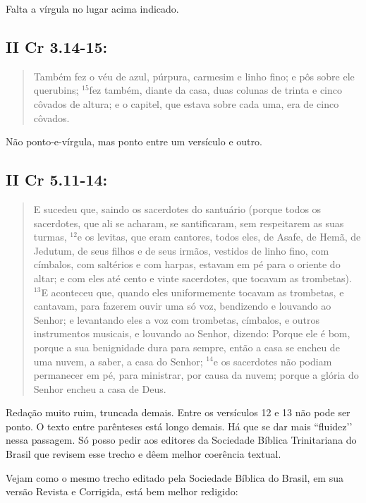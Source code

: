 Falta a vírgula no lugar acima indicado.

\subsection{II Cr 3.14-15:}
\begin{quote}
    \small
 Também fez o véu de azul, púrpura, carmesim e linho fino; e pôs sobre ele querubins\uline{;} $^{\mathrm{15}}$fez também, diante da casa, duas colunas de trinta e cinco côvados de altura; e o capitel, que estava sobre cada uma, era de cinco côvados.
 \end{quote}
 
Não ponto-e-vírgula, mas ponto entre um versículo e outro.

\subsection{II Cr 5.11-14:}
\begin{quote}
    \small
 E sucedeu que, saindo os sacerdotes do santuário (porque todos os sacerdotes, que ali se acharam, se santificaram, sem respeitarem as suas turmas, $^{\mathrm{12}}$e os levitas, que eram cantores, todos eles, de Asafe, de Hemã, de Jedutum, de seus filhos e de seus irmãos, vestidos de linho fino, com címbalos, com saltérios e com harpas, estavam em pé para o oriente do altar; e com eles até cento e vinte sacerdotes, que tocavam as trombetas). $^{\mathrm{13}}$E aconteceu que, quando eles uniformemente tocavam as trombetas, e cantavam, para fazerem ouvir uma só voz, bendizendo e louvando ao Senhor; e levantando eles a voz com trombetas, címbalos, e outros instrumentos musicais, e louvando ao Senhor, dizendo: Porque ele é bom, porque a sua benignidade dura para sempre, então a casa se encheu de uma nuvem, a saber, a casa do Senhor; $^{\mathrm{14}}$e os sacerdotes não podiam permanecer em pé, para ministrar, por causa da nuvem; porque a glória do Senhor encheu a casa de Deus.
\end{quote}

Redação muito ruim, truncada demais. Entre os versículos 12 e 13
não pode ser ponto. O texto entre parênteses está longo demais. Há que
se dar mais ``fluidez’’ nessa passagem. Só posso pedir aos editores
da Sociedade Bíblica Trinitariana do Brasil que revisem esse trecho e
dêem melhor coerência textual.

Vejam como o mesmo trecho editado pela Sociedade Bíblica
do Brasil, em sua versão Revista e Corrigida, está bem melhor redigido:

